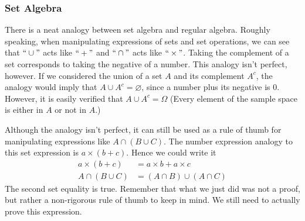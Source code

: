 \documentclass[11pt,letterpaper]{article}
\numberwithin{theorem}{section}
\numberwithin{definition}{section}
\numberwithin{lemma}{section}
\numberwithin{corollary}{section}
\numberwithin{proposition}{section}
\theoremstyle{definition}
\numberwithin{remark}{section}
\numberwithin{claim}{section}
\numberwithin{observation}{section}
\numberwithin{fact}{section}
\numberwithin{assumption}{section}
\numberwithin{example}{section}
\numberwithin{exercise}{section}
\begin{document}
\subsubsection{Set Algebra}

There is a neat analogy between set algebra and regular algebra. Roughly speaking, when manipulating expressions of sets and set operations, we can see that $``\cup"$ acts like $``+"$ and $``\cap"$ acts like $``\times"$. Taking the complement of a set corresponds to taking the negative of a number. This analogy isn't perfect, however. If we considered the union of a set $A$ and its complement $A^c$, the analogy would imply that $A \cup A^c = \varnothing$, since a number plus its negative is 0. However, it is easily verified that $A \cup A^c = \Omega$ (Every element of the sample space is either in $A$ or not in $A$.)

Although the analogy isn't perfect, it can still be used as a rule of thumb for manipulating expressions like $A \cap (B \cup C)$. The number expression analogy to this set expression is $a \times (b + c)$. Hence we could write it
\begin{align*}
a \times (b + c) &= a \times b + a \times c \\
A \cap (B \cup C) &= (A \cap B) \cup (A \cap C)
\end{align*}
The second set equality is true. Remember that what we just did was not a proof, but rather a non-rigorous rule of thumb to keep in mind. We still need to actually prove this expression.
\end{document}
